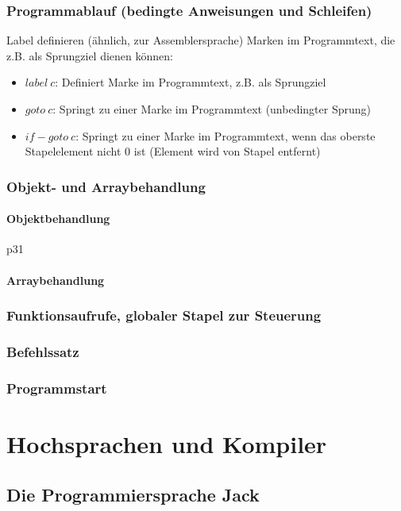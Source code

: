 \documentclass[12pt]{report}
\begin{document}
\subsection{Programmablauf (bedingte Anweisungen und Schleifen)}
Label definieren (ähnlich, zur Assemblersprache) Marken im Programmtext, die z.B. als Sprungziel dienen können:

\begin{itemize}
  \item $label\ c$: Definiert Marke im Programmtext, z.B. als Sprungziel
  \item $goto\ c$: Springt zu einer Marke im Programmtext (unbedingter Sprung)
  \item $if-goto\ c$: Springt zu einer Marke im Programmtext, wenn das oberste Stapelelement nicht $0$ ist (Element wird von Stapel entfernt)
\end{itemize}

\subsection{Objekt- und Arraybehandlung}
\subsubsection{Objektbehandlung}
p31
\subsubsection{Arraybehandlung}

\subsection{Funktionsaufrufe, globaler Stapel zur Steuerung}
\subsection{Befehlssatz}
\subsection{Programmstart}

\chapter{Hochsprachen und Kompiler}

\section{Die Programmiersprache Jack}
\end{document}
